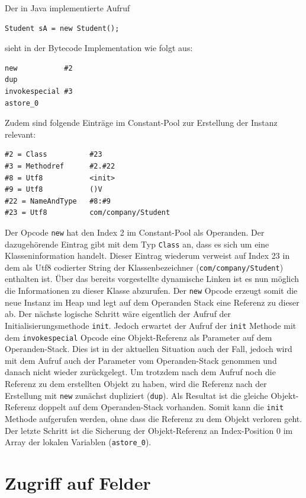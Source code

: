\documentclass[conference]{IEEEtran}
\begin{document}
Der in Java implementierte Aufruf
\begin{lstlisting}
Student sA = new Student();
\end{lstlisting}
sieht in der Bytecode Implementation wie folgt aus:
\begin{lstlisting}
new           #2                  
dup
invokespecial #3                 
astore_0
\end{lstlisting}
Zudem sind folgende Einträge im Constant-Pool zur Erstellung der Instanz relevant:
\begin{lstlisting}
#2 = Class          #23
#3 = Methodref      #2.#22
#8 = Utf8           <init>
#9 = Utf8           ()V
#22 = NameAndType   #8:#9
#23 = Utf8          com/company/Student
\end{lstlisting}
Der Opcode \verb|new| hat den Index 2 im Constant-Pool als Operanden. Der dazugehörende Eintrag gibt mit dem Typ \verb|Class| an, dass es sich um eine Klasseninformation handelt. Dieser Eintrag wiederum verweist auf Index 23 in dem als Utf8 codierter String der Klassenbezeichner (\verb|com/company/Student|) enthalten ist. Über das bereits vorgestellte dynamische Linken ist es nun möglich die Informationen zu dieser Klasse abzurufen. Der \verb|new| Opcode erzeugt somit die neue Instanz im Heap und legt auf dem Operanden Stack eine Referenz zu dieser ab. Der nächste logische Schritt wäre eigentlich der Aufruf der Initialisierungsmethode \verb|init|. Jedoch erwartet der Aufruf der \verb|init| Methode mit dem \verb|invokespecial| Opcode eine Objekt-Referenz als Parameter auf dem Operanden-Stack. Dies ist in der aktuellen Situation auch der Fall, jedoch wird mit dem Aufruf auch der Parameter vom Operanden-Stack genommen und danach nicht wieder zurückgelegt. Um trotzdem nach dem Aufruf noch die Referenz zu dem erstellten Objekt zu haben, wird die Referenz nach der Erstellung mit \verb|new| zunächst dupliziert (\verb|dup|). Als Resultat ist die gleiche Objekt-Referenz doppelt auf dem Operanden-Stack vorhanden. Somit kann die \verb|init| Methode aufgerufen werden, ohne dass die Referenz zu dem Objekt verloren geht. Der letzte Schritt ist die Sicherung der Objekt-Referenz an Index-Position 0 im Array der lokalen Variablen (\verb|astore_0|).


\section{Zugriff auf Felder}
\end{document}
